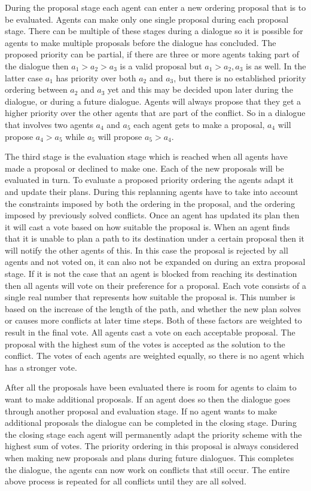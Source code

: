 During the proposal stage each agent can enter a new ordering proposal that is
to be evaluated. Agents can make only one single proposal during each proposal
stage. There can be multiple of these stages during a dialogue so it is
possible for agents to make multiple proposals before the dialogue has
concluded. The proposed priority can be
partial, if there are three or more agents taking part of the dialogue then
$a_1 > a_2 > a_3$ is a valid proposal but $a_1 > a_2, a_3$ is as well. In the
latter case $a_1$ has priority over both $a_2$ and $a_3$, but there is no
established priority ordering between $a_2$ and $a_3$ yet and this may be
decided upon later during the dialogue, or during a future dialogue. Agents
will always propose that they get a higher priority over the other agents that
are part of the conflict. So in a dialogue that involves two agents $a_4$ and
$a_5$ each agent gets to make a proposal, $a_4$ will propose $a_4 > a_5$ while
$a_5$ will propose $a_5 > a_4$.

The third stage is the evaluation stage which is reached when all agents have
made a proposal or declined to make one. Each of the new proposals will be
evaluated in turn. To evaluate a proposed priority ordering the agents adapt it
and update their plans. During this replanning agents have to take into account
the constraints imposed by both the ordering in the proposal, and the ordering
imposed by previously solved conflicts. Once an agent has updated its plan then
it will cast a vote based on how suitable the proposal is. When an agent finds
that it is unable to plan a path to its destination under a certain proposal
then it will notify the other agents of this. In this case the proposal is
rejected by all agents and not voted on, it can also not be expanded on during
an extra proposal stage. If it is not the case that an agent is blocked from
reaching its destination then all agents will vote on their preference for a
proposal. Each vote consists of a single real number that represents how
suitable the proposal is. This number is based on the increase of the length of
the path, and whether the new plan solves or causes more conflicts at later
time steps. Both of these factors are weighted to result in the final vote. All
agents cast a vote on each acceptable proposal. The proposal with the highest
sum of the votes is accepted as the solution to the conflict. The votes of each
agents are weighted equally, so there is no agent which has a stronger vote.

After all the proposals have been evaluated there is room for agents to claim
to want to make additional proposals. If an agent does so then the dialogue
goes through another proposal and evaluation stage. If no agent wants to make
additional proposals the dialogue can be completed in the closing stage. During
the closing stage each agent will permanently adapt the priority scheme with
the highest sum of votes. The priority ordering in this proposal is always
considered when making new proposals and plans during future dialogues. This
completes the dialogue, the agents can now work on conflicts that still occur.
The entire above process is repeated for all conflicts until they are all
solved.

